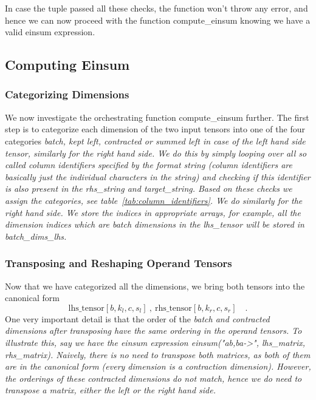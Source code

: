 \documentclass[sigconf]{acmart}
\renewcommand{\texttt}[1]{\begingroup\ttfamily\sloppy\hbadness=10000 #1\endgroup}
\begin{document}
\noindent
In case the tuple passed all these checks, the function won't throw any error, and hence we can now proceed with the function \texttt{compute\_einsum} knowing we have a valid einsum expression.


\subsection{Computing Einsum}
\subsubsection{Categorizing Dimensions}
We now investigate the orchestrating function \texttt{compute\_einsum} further.
The first step is to categorize each dimension of the two input tensors into one of the four categories \em batch, kept left, contracted \em or \em summed left \em in case of the left hand side tensor, similarly for the right hand side. We do this by simply looping over all so called \em column identifiers \em specified by the format string (column identifiers are basically just the individual characters in the string) and checking if this identifier is also present in the \texttt{rhs\_string} and \texttt{target\_string}. Based on these checks we assign the categories, see table~\ref{tab:column_identifiers}. We do similarly for the right hand side. We store the indices in appropriate arrays, for example, all the dimension indices which are batch dimensions in the \texttt{lhs\_tensor} will be stored in \texttt{batch\_dims\_lhs}.

\subsubsection{Transposing and Reshaping Operand Tensors}
Now that we have categorized all the dimensions, we bring both tensors into the canonical form
\[ \text{lhs\_tensor}[{b}, {k_l}, {c}, {s_l}] \ , \ \text{rhs\_tensor}[{b}, {k_r}, {c}, {s_r}] \quad . \]
One very important detail is that the order of the \em batch \em and \em contracted \em dimensions after transposing have the same ordering in the operand tensors. To illustrate this, say we have the einsum expression \texttt{einsum("ab,ba->", lhs\_matrix, rhs\_matrix)}. Naively, there is no need to transpose both matrices, as both of them are in the canonical form (every dimension is a contraction dimension). However, the orderings of these contracted dimensions do not match, hence we do need to transpose a matrix, either the left or the right hand side.
\end{document}
